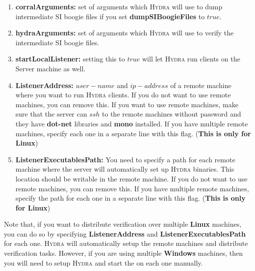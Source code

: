 \documentclass{article}
\begin{document}
\begin{enumerate}
  \item \textbf{corralArguments:} set of arguments which \textsc{Hydra} will use to dump intermediate SI boogie files if you set \textbf{dumpSIBoogieFiles} to $true$.
  \item \textbf{hydraArguments:} set of arguments which \textsc{Hydra} will use to verify the intermediate SI boogie files.
  \item \textbf{startLocalListener:} setting this to $true$ will let \textsc{Hydra} run clients on the Server machine as well.
  \item \textbf{ListenerAddress:} $user-name$ and $ip-address$ of a remote machine where you want to run \textsc{Hydra} clients. If you do not want to use remote machines, you can remove this. If you want to use remote machines, make sure that the server can $ssh$ to the remote machines without password and they have \textbf{dot-net} libraries and \textbf{mono} installed. If you have multiple remote machines, specify each one in a separate line with this flag. (\textbf{This is only for Linux})
  \item \textbf{ListenerExecutablesPath:} You need to specify a path for each remote machine where the server will automatically set up \textsc{Hydra} binaries. This location should be writable in the remote machine. If you do not want to use remote machines, you can remove this. If you have multiple remote machines, specify the path for each one in a separate line with this flag. (\textbf{This is only for Linux})
\end{enumerate}
\par
\noindent
Note that, if you want to distribute verification over multiple \textbf{Linux} machines, you can do so by specifying \textbf{ListenerAddress} and \textbf{ListenerExecutablesPath} for each one. \textsc{Hydra} will automatically setup the remote machines and distribute verification tasks. However, if you are using multiple \textbf{Windows} machines, then you will need to setup \textsc{Hydra} and start the  on each one manually.
\end{document}
